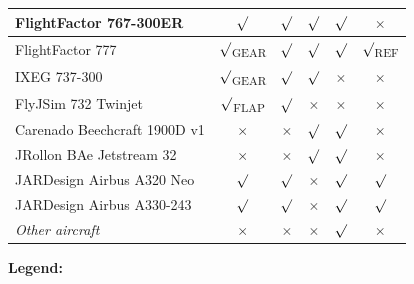 \documentclass[a4paper,12pt]{article}
\begin{document}
\begin{center}
\begin{tabular}{|p{7cm}|c|c|c|c|c|}
FlightFactor 767-300ER & $\surd$ & $\surd$ & $\surd$ & $\surd$ & $\times$ \\

\hline

FlightFactor 777 & $\surd$\textsubscript{GEAR} & $\surd$ & $\surd$ &
$\surd$ & $\surd$\textsubscript{REF} \\

\hline

IXEG 737-300 & $\surd$\textsubscript{GEAR} & $\surd$ & $\surd$ &
$\times$ & $\times$ \\

\hline

FlyJSim 732 Twinjet & $\surd$\textsubscript{FLAP} & $\surd$ & $\times$ &
$\times$ & $\times$ \\

\hline

Carenado Beechcraft 1900D v1 & $\times$ & $\times$ & $\surd$ & $\surd$ &
$\times$ \\

\hline

JRollon BAe Jetstream 32 & $\times$ & $\times$ & $\surd$ & $\surd$ &
$\times$ \\

\hline

JARDesign Airbus A320 Neo & $\surd$ & $\surd$ & $\times$ & $\surd$ & $\surd$ \\

\hline

JARDesign Airbus A330-243 & $\surd$ & $\surd$ & $\times$ & $\surd$ & $\surd$ \\

\hline

\emph{Other aircraft} & $\times$ & $\times$ & $\times$ & $\surd$ & $\times$ \\

\hline

\end{tabular}
\end{center}

\noindent\textbf{\large Legend:}\vspace{0.5em}
\end{document}
